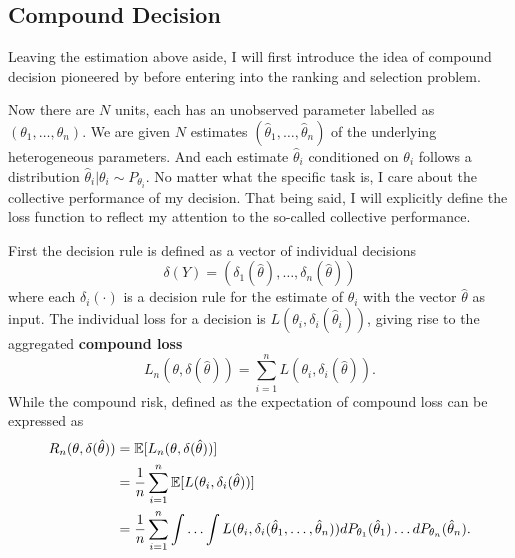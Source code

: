 \documentclass[12pt]{article}
\begin{document}
\subsection{Compound Decision}
Leaving the estimation above aside, I will first introduce the idea of compound
decision pioneered by \cite{robbins1956empirical} before entering into the
ranking and selection problem.

Now there are $N$ units, each has an unobserved parameter labelled as
$(\theta_1,\ldots, \theta_n)$. We are given $N$ estimates
$(\hat{\theta}_1,\ldots, \hat{\theta}_n) $ of the underlying heterogeneous
parameters. And each estimate $\hat{\theta}_i$ conditioned on $\theta_i$
follows a distribution $\hat{\theta}_i | \theta_i \sim P_{\theta_i}$. No matter
what the specific task is, I care about the collective performance of my
decision. That being said, I will explicitly define the loss function to
reflect my attention to the so-called collective performance.

First the decision rule is defined as a vector of individual decisions
\begin{equation*}
    \delta(Y) = (\delta_1(\hat{\theta}), \ldots, \delta_n(\hat{\theta}))
\end{equation*}
where each $\delta_i(\cdot)$ is a decision rule for the estimate of $\theta_i$ with the vector $\hat{\theta}$ as input.
The individual loss for a decision is $L(\theta_i, \delta_i(\hat{\theta}_i))$, giving rise to the aggregated \textbf{compound loss}
\begin{equation*}
    L_n(\theta, \delta(\hat{\theta})) = \sum_{i=1}^n L(\theta_i, \delta_i(\hat{\theta})).
\end{equation*}
While the compound risk, defined as the expectation of compound loss can be expressed as
\begin{align*}
    R_n(\theta, \delta(\hat{\theta})) & = \mathbb{E}[L_n(\theta, \delta(\hat{\theta}))]                                                                                                                                    \\
                                      & = \frac{1}{n}\sum_{i=1}^n \mathbb{E}[L(\theta_i, \delta_i(\hat{\theta}))]                                                                                                          \\
                                      & = \frac{1}{n}\sum_{i=1}^n \int \ldots \int L(\theta_i, \delta_i(\hat{\theta}_1, \ldots, \hat{\theta}_n))dP_{\theta_1}(\hat{\theta}_1)\ldots dP_{\theta_n}(\hat{\theta}_n). \\
\end{align*}
\end{document}
